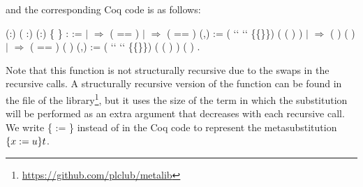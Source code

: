 \noindent and the corresponding Coq code is as follows: 
\begin{coqdoccode}
\coqdocemptyline
\coqdocnoindent
{}  (:) ( :) (:) \{  \} :  :=\coqdoceol
\coqdocindent{1.00em}
  \coqdoceol
\coqdocindent{1.00em}
\ensuremath{|}   \ensuremath{\Rightarrow}  ( == )    \coqdoceol
\coqdocindent{1.00em}
\ensuremath{|}    \ensuremath{\Rightarrow}  ( == )     (,\coqdocvar{\_}) :=\coqdoceol
\coqdocindent{2.00em}
 (  ``   `` \{\{\}\})    ( (   )  )\coqdoceol
\coqdocindent{1.00em}
\ensuremath{|}    \ensuremath{\Rightarrow}  (   ) (   )\coqdoceol
\coqdocindent{1.00em}
\ensuremath{|}     \ensuremath{\Rightarrow}  ( == )     (   )   (,\coqdocvar{\_}) :=\coqdoceol
\coqdocindent{2.00em}
 (  ``   `` \{\{\}\}) \coqdoceol
\coqdocindent{2.00em}
 ( (   )  )  (   ) \coqdoceol
\coqdocnoindent
{}.\coqdoceol
\end{coqdoccode}
Note that this function is not structurally recursive due to the swaps in the recursive calls. A structurally recursive version of the function  can be found in the file  of the  library\footnote{\url{https://github.com/plclub/metalib}}, but it uses the size of the term in which the substitution will be performed as an extra argument that decreases with each recursive call. We write \{ := \} instead of     in the Coq code to represent the metasubstitution $\metasub{t}{x}{u}$.
